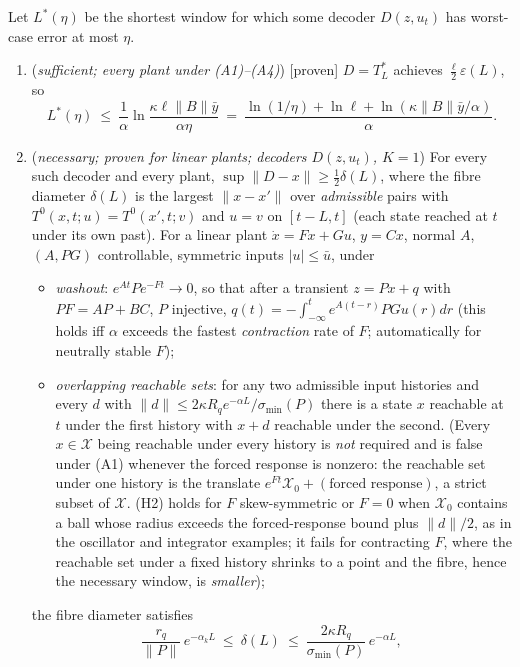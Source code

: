 \begin{theorem}\label{thm:m2-window}
Let $L^*(\eta)$ be the shortest window for which some decoder $D(z,u_t)$ has worst-case error at most $\eta$.
\begin{enumerate}
\item[(a)] (\emph{sufficient; every plant under (A1)--(A4)}) [proven] $D=T_L^*$ achieves
$\tfrac{\ell}{2}\varepsilon(L)$, so
\[
L^*(\eta)\ \le\ \frac1\alpha\ln\frac{\kappa\ell\|B\|\bar y}{\alpha\eta}\ =\ \frac{\ln(1/\eta)+\ln\ell+\ln(\kappa\|B\|\bar y/\alpha)}{\alpha}.
\]
\item[(b)] (\emph{necessary; proven for linear plants; decoders $D(z,u_t)$, $K=1$}) For every such decoder and every plant,
$\sup\|D-x\|\ge\frac12\delta(L)$, where the fibre diameter $\delta(L)$ is the largest $\|x-x'\|$ over
\emph{admissible} pairs with $T^0(x,t;u)=T^0(x',t;v)$ and $u=v$ on $[t-L,t]$ (each state reached at $t$ under its own
past). For a linear plant $\dot x=Fx+Gu$, $y=Cx$, normal $A$, $(A,PG)$ controllable, symmetric inputs $|u|\le\bar u$, under
\begin{itemize}
\item[(H1)] \emph{washout}: $e^{At}Pe^{-Ft}\to0$, so that after a transient $z=Px+q$ with $PF=AP+BC$, $P$
injective, $q(t)=-\int_{-\infty}^te^{A(t-r)}PGu(r)dr$ (this holds iff $\alpha$ exceeds the fastest
\emph{contraction} rate of $F$; automatically for neutrally stable $F$);
\item[(H2)] \emph{overlapping reachable sets}: for any two admissible input histories and every $d$ with
$\|d\|\le2\kappa R_qe^{-\alpha L}/\sigma_{\min}(P)$ there is a state $x$ reachable at $t$ under the first history with
$x+d$ reachable under the second. (Every $x\in\mathcal X$ being reachable under every history is \emph{not} required and
is false under (A1) whenever the forced response is nonzero: the reachable set under one history is the translate
$e^{Ft}\mathcal X_0+(\text{forced response})$, a strict subset of $\mathcal X$. (H2) holds for $F$ skew-symmetric or
$F=0$ when $\mathcal X_0$ contains a ball whose radius exceeds the forced-response bound plus $\|d\|/2$, as in the
oscillator and integrator examples; it fails for contracting $F$, where the reachable set under a fixed history shrinks
to a point and the fibre, hence the necessary window, is \emph{smaller});
\end{itemize}
the fibre diameter satisfies
\[
 \frac{r_q}{\|P\|}\,e^{-\alpha_k L}\ \le\ \delta(L)\ \le\ \frac{2\kappa R_q}{\sigma_{\min}(P)}\,e^{-\alpha L},
\]
\end{enumerate}
\end{theorem}
